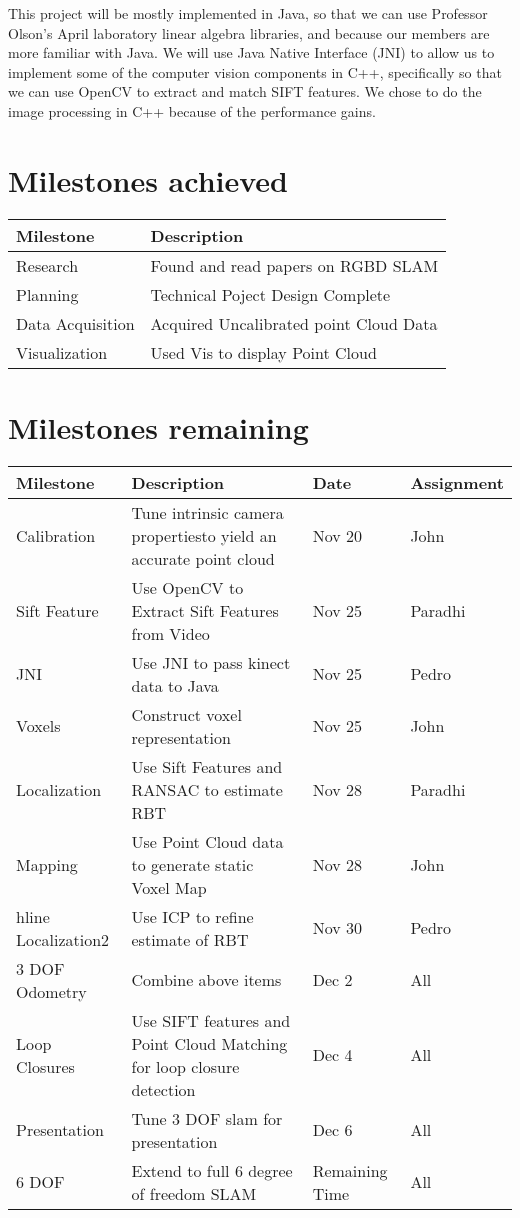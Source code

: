 \documentclass[12pt]{article}
\begin{document}
This project will be mostly implemented in Java, so that we can use Professor Olson's April laboratory linear algebra libraries, and because our members are more familiar with Java.  We will use Java Native Interface (JNI) to allow us to implement some of the computer vision components in C++, specifically so that we can use OpenCV to extract and match SIFT features. We chose to do the image processing in C++ because of the performance gains.

\section{Milestones achieved}
\begin{tabular}{| l | p{6cm} | }
\hline
Milestone & Description \\ \hline
Research & Found and read papers on RGBD SLAM \\ \hline
Planning & Technical Poject Design Complete \\ \hline
Data Acquisition & Acquired Uncalibrated point Cloud Data \\ \hline
Visualization & Used Vis to display Point Cloud \\ \hline

\end{tabular}


\section{Milestones remaining}
\begin{tabular}{|l |p{5cm}| |l| l|}
\hline
Milestone & Description & Date & Assignment \\ \hline
Calibration & Tune intrinsic camera properties\newline to yield an accurate point cloud & Nov 20 & John \\ \hline
Sift Feature & Use OpenCV to Extract Sift \newline Features from Video & Nov 25 & Paradhi \\ \hline
JNI & Use JNI to pass kinect data to Java & Nov 25 & Pedro \\ \hline
Voxels & Construct voxel representation & Nov 25 & John \\ \hline
Localization & Use Sift Features and RANSAC to \newline estimate RBT & Nov 28 & Paradhi \\ \hline
Mapping & Use Point Cloud data to generate \newline static Voxel Map & Nov 28 & John \\ hline
Localization2 & Use ICP to refine estimate of RBT & Nov 30 & Pedro \\ \hline
3 DOF Odometry & Combine above items & Dec 2 & All \\ \hline
Loop Closures & Use SIFT features and Point Cloud \newline Matching for loop closure detection & Dec 4 & All \\ \hline
Presentation & Tune 3 DOF slam for presentation & Dec 6 & All \\ \hline
6 DOF & Extend to full 6 degree of freedom SLAM & Remaining Time & All \\ \hline
\end{tabular}
\end{document}
